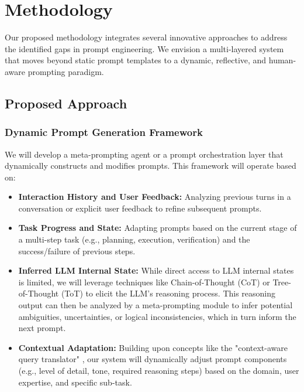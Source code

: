 \documentclass{article}
\begin{document}
\section{Methodology}
Our proposed methodology integrates several innovative approaches to address the identified gaps in prompt engineering. We envision a multi-layered system that moves beyond static prompt templates to a dynamic, reflective, and human-aware prompting paradigm.

\subsection{Proposed Approach}

\subsubsection{Dynamic Prompt Generation Framework}
We will develop a meta-prompting agent or a prompt orchestration layer that dynamically constructs and modifies prompts. This framework will operate based on:
\begin{itemize}
    \item \textbf{Interaction History and User Feedback:} Analyzing previous turns in a conversation or explicit user feedback to refine subsequent prompts.
    \item \textbf{Task Progress and State:} Adapting prompts based on the current stage of a multi-step task (e.g., planning, execution, verification) and the success/failure of previous steps.
    \item \textbf{Inferred LLM Internal State:} While direct access to LLM internal states is limited, we will leverage techniques like Chain-of-Thought (CoT) or Tree-of-Thought (ToT) to elicit the LLM's reasoning process. This reasoning output can then be analyzed by a meta-prompting module to infer potential ambiguities, uncertainties, or logical inconsistencies, which in turn inform the next prompt.
    \item \textbf{Contextual Adaptation:} Building upon concepts like the "context-aware query translator" \cite{paper5_legalrag}, our system will dynamically adjust prompt components (e.g., level of detail, tone, required reasoning steps) based on the domain, user expertise, and specific sub-task.
\end{itemize}
\end{document}
